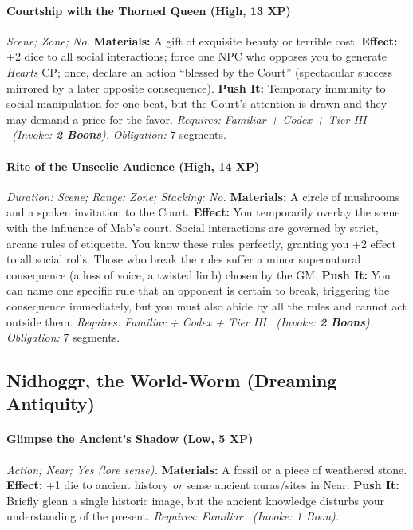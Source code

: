 \documentclass[12pt,twoside]{book}
\begin{document}
\paragraph{Courtship with the Thorned Queen (High, 13 XP)} \emph{Scene; Zone; No.}
\textbf{Materials:} A gift of exquisite beauty or terrible cost.
\textbf{Effect:} +2 dice to all social interactions; force one NPC who opposes you to generate \emph{Hearts} CP; once, declare an action ``blessed by the Court'' (spectacular success mirrored by a later opposite consequence).
\textbf{Push It:} Temporary immunity to social manipulation for one beat, but the Court's attention is drawn and they may demand a price for the favor.
\emph{Requires: Familiar + Codex + Tier III \ (\textit{Invoke:} \textbf{2 Boons}).}
\emph{Obligation:} 7 segments.

\paragraph{Rite of the Unseelie Audience (High, 14 XP)} \emph{Duration: Scene; Range: Zone; Stacking: No.}
\textbf{Materials:} A circle of mushrooms and a spoken invitation to the Court.
\textbf{Effect:} You temporarily overlay the scene with the influence of Mab's court. Social interactions are governed by strict, arcane rules of etiquette. You know these rules perfectly, granting you +2 effect to all social rolls. Those who break the rules suffer a minor supernatural consequence (a loss of voice, a twisted limb) chosen by the GM.
\textbf{Push It:} You can name one specific rule that an opponent is certain to break, triggering the consequence immediately, but you must also abide by all the rules and cannot act outside them.
\emph{Requires: Familiar + Codex + Tier III \ (\textit{Invoke:} \textbf{2 Boons}).}
\emph{Obligation:} 7 segments.

\subsection{Nidhoggr, the World-Worm (Dreaming Antiquity)}
\paragraph{Glimpse the Ancient's Shadow (Low, 5 XP)} \emph{Action; Near; Yes (lore sense).}
\textbf{Materials:} A fossil or a piece of weathered stone.
\textbf{Effect:} +1 die to ancient history \emph{or} sense ancient auras/sites in Near.
\textbf{Push It:} Briefly glean a single historic image, but the ancient knowledge disturbs your understanding of the present.
\emph{Requires: Familiar \ (\textit{Invoke:} 1 Boon).}
\end{document}
